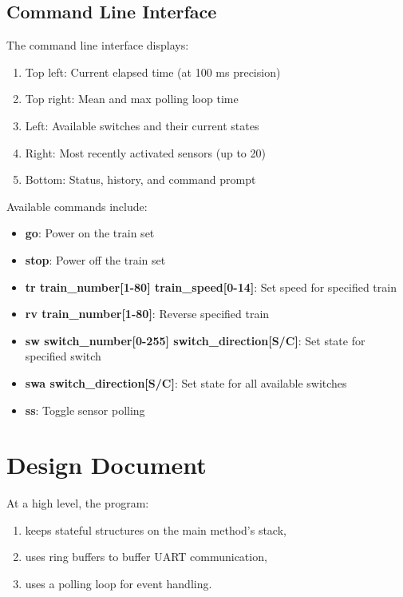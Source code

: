 \documentclass[11pt]{article}
\begin{document}
\subsection{Command Line Interface}
The command line interface displays:
\begin{enumerate}
	\item Top left: Current elapsed time (at 100 ms precision)
	\item Top right: Mean and max polling loop time
	\item Left: Available switches and their current states
	\item Right: Most recently activated sensors (up to 20)
	\item Bottom: Status, history, and command prompt
\end{enumerate}
Available commands include:
\begin{itemize}
	\item \textbf{go}: Power on the train set
	\item \textbf{stop}: Power off the train set
	\item \textbf{tr train{\_}number[1-80] train{\_}speed[0-14]}: Set speed for specified train
	\item \textbf{rv train\_number[1-80]}: Reverse specified train
	\item \textbf{sw switch\_number[0-255] switch\_direction[S/C]}: Set state for specified switch
	\item \textbf{swa switch\_direction[S/C]}: Set state for all available switches
	\item \textbf{ss}: Toggle sensor polling
\end{itemize}


\section{Design Document}
At a high level, the program: 
\begin{enumerate}
	\item keeps stateful structures on the main method's stack, 
	\item uses ring buffers to buffer UART communication,
	\item uses a polling loop for event handling.
\end{enumerate}
\end{document}
